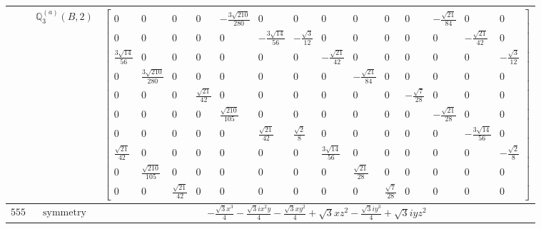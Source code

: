 \documentclass[fleqn,8pt,landscape]{jsarticle}
\begin{document}
\begin{longtable}{ccc}
$  $ & $ \mathbb{Q}_{3}^{(a)}(B,2) $ & $ \begin{bmatrix} 0 & 0 & 0 & 0 & - \frac{3 \sqrt{210}}{280} & 0 & 0 & 0 & 0 & 0 & 0 & - \frac{\sqrt{21}}{84} & 0 & 0 \\ 0 & 0 & 0 & 0 & 0 & - \frac{3 \sqrt{14}}{56} & - \frac{\sqrt{3}}{12} & 0 & 0 & 0 & 0 & 0 & - \frac{\sqrt{21}}{42} & 0 \\ \frac{3 \sqrt{14}}{56} & 0 & 0 & 0 & 0 & 0 & 0 & - \frac{\sqrt{21}}{42} & 0 & 0 & 0 & 0 & 0 & - \frac{\sqrt{3}}{12} \\ 0 & \frac{3 \sqrt{210}}{280} & 0 & 0 & 0 & 0 & 0 & 0 & - \frac{\sqrt{21}}{84} & 0 & 0 & 0 & 0 & 0 \\ 0 & 0 & 0 & \frac{\sqrt{21}}{42} & 0 & 0 & 0 & 0 & 0 & 0 & - \frac{\sqrt{7}}{28} & 0 & 0 & 0 \\ 0 & 0 & 0 & 0 & \frac{\sqrt{210}}{105} & 0 & 0 & 0 & 0 & 0 & 0 & - \frac{\sqrt{21}}{28} & 0 & 0 \\ 0 & 0 & 0 & 0 & 0 & \frac{\sqrt{21}}{42} & \frac{\sqrt{2}}{8} & 0 & 0 & 0 & 0 & 0 & - \frac{3 \sqrt{14}}{56} & 0 \\ \frac{\sqrt{21}}{42} & 0 & 0 & 0 & 0 & 0 & 0 & \frac{3 \sqrt{14}}{56} & 0 & 0 & 0 & 0 & 0 & - \frac{\sqrt{2}}{8} \\ 0 & \frac{\sqrt{210}}{105} & 0 & 0 & 0 & 0 & 0 & 0 & \frac{\sqrt{21}}{28} & 0 & 0 & 0 & 0 & 0 \\ 0 & 0 & \frac{\sqrt{21}}{42} & 0 & 0 & 0 & 0 & 0 & 0 & \frac{\sqrt{7}}{28} & 0 & 0 & 0 & 0 \end{bmatrix} $ \\ \hline
$ 555 $ & $ \text{symmetry} $ & $ - \frac{\sqrt{3} x^{3}}{4} - \frac{\sqrt{3} i x^{2} y}{4} - \frac{\sqrt{3} x y^{2}}{4} + \sqrt{3} x z^{2} - \frac{\sqrt{3} i y^{3}}{4} + \sqrt{3} i y z^{2} $ \\

\end{longtable}
\end{document}
